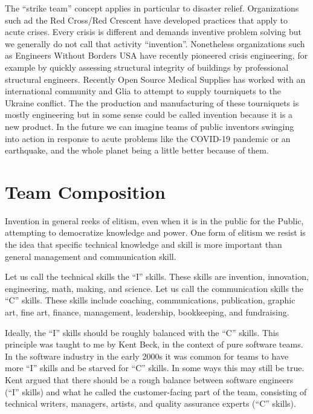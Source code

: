 \documentclass[
	fontsize=10pt, %
	twoside=false, %
	secnumdepth=1, %
]{kaobook}
\begin{document}
The ``strike team'' concept applies in particular to disaster relief.
Organizations such ad the Red Cross/Red Crescent have developed
practices that apply to acute crises. Every crisis is different and demands
inventive problem solving
but we generally do not call that activity ``invention''.
Nonetheless organizations such as Engineers Without Borders USA have
recently pioneered crisis engineering, for example by quickly assessing
structural integrity of buildings by professional structural engineers.
Recently Open Source Medical Supplies has worked with an international community
and Glia to attempt to supply tourniquets to the Ukraine conflict.
The the production and manufacturing of these tourniquets is mostly
engineering but in some sense could be called invention because it is a new
product. In the future we can imagine teams of public inventors swinging
into action in response to acute problems like the COVID-19 pandemic
or an earthquake, and the whole planet being a little better because
of them.

\chapter{Team Composition}

\label{chap:composition}

Invention in general reeks of elitism, even when it is in
the public for the Public, attempting to democratize knowledge and power.
One form of elitism we resist is the idea that specific technical knowledge
and skill is more important than general management and communication skill.

Let us call the technical skills the ``I'' skills. These skills
are invention, innovation, engineering, math, making, and science.
Let us call the communication skills the ``C'' skills. These skills
include coaching, communications, publication, graphic art, fine art,
finance, management, leadership, bookkeeping, and fundraising.

Ideally, the ``I'' skills should be roughly balanced with the ``C'' skills.
This principle was taught to me by Kent Beck, in the context of pure
software teams. In the software industry in the early 2000s it was common
for teams to have more ``I'' skills and be starved for ``C'' skills.
In some ways this may still be true. Kent argued that there
should be a rough balance between software engineers (``I'' skills) and what he
called the customer-facing part of the team, consisting of technical writers,
managers, artists, and quality assurance experts (``C'' skills).
\end{document}
